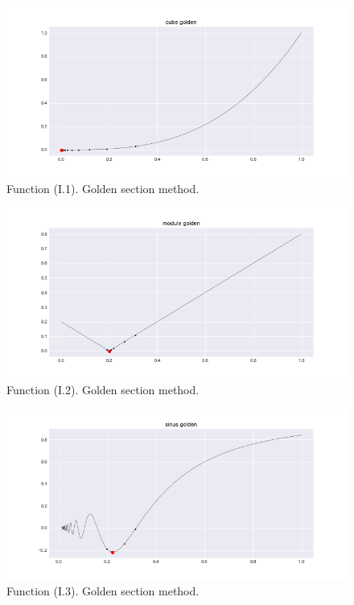 \documentclass[a4paper,article,14pt]{extarticle}
\begin{document}
	\begin{figure}[h]
		\centering
		\includegraphics[scale=0.5]{cube_golden.png}
		\caption{Function (I.1). Golden section method.}
		\label{cubeGolden}
	\end{figure}
	\begin{figure}[h]
		\centering
		\includegraphics[scale=0.5]{module_golden.png}
		\caption{Function (I.2). Golden section method.}
		\label{moduleGolden}
	\end{figure}
	\begin{figure}[h]
		\centering
		\includegraphics[scale=0.5]{sinus_golden.png}
		\caption{Function (I.3). Golden section method.}
		\label{sinGolden}
	\end{figure}
	
\end{document}
